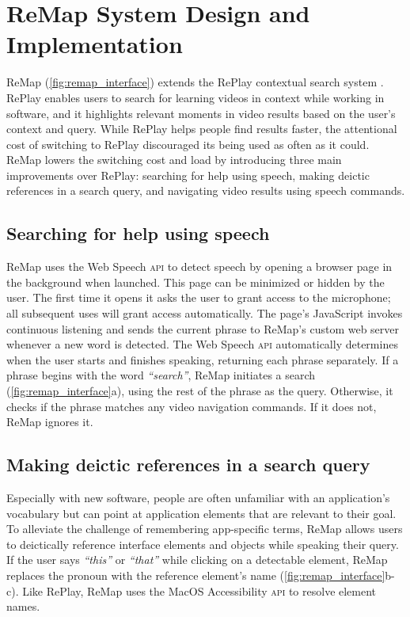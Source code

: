 \section{ReMap System Design and Implementation}
ReMap (\autoref{fig:remap_interface}) extends the RePlay contextual search system \cite{Fraser2019}. RePlay enables users to search for learning videos in context while working in software, and it highlights relevant moments in video results based on the user's context and query. While RePlay helps people find results faster, the attentional cost of switching to RePlay discouraged its being used as often as it could. ReMap lowers the switching cost and load by introducing three main improvements over RePlay: searching for help using speech, making deictic references in a search query, and navigating video results using speech commands.

\subsection{Searching for help using speech}
ReMap uses the Web Speech \textsc{api} to detect speech by opening a browser page in the background when launched. This page can be minimized or hidden by the user. The first time it opens it asks the user to grant access to the microphone; all subsequent uses will grant access automatically. The page's JavaScript invokes continuous listening and sends the current phrase to ReMap's custom web server whenever a new word is detected.
The Web Speech \textsc{api} automatically determines when the user starts and finishes speaking, returning each phrase separately. If a phrase begins with the word \textit{``search''}, ReMap initiates a search (\autoref{fig:remap_interface}a), using the rest of the phrase as the query. Otherwise, it checks if the phrase matches any video navigation commands. If it does not, ReMap ignores it.

\subsection{Making deictic references in a search query}
Especially with new software, people are often unfamiliar with an application's vocabulary but can point at application elements that are relevant to their goal. 
To alleviate the challenge of remembering app-specific terms, ReMap allows users to deictically reference interface elements and objects while speaking their query. If the user says \textit{``this''} or \textit{``that''} while clicking on a detectable element, ReMap replaces the pronoun with the reference element's name (\autoref{fig:remap_interface}b-c). Like RePlay, ReMap uses the MacOS Accessibility \textsc{api} to resolve element names. 

